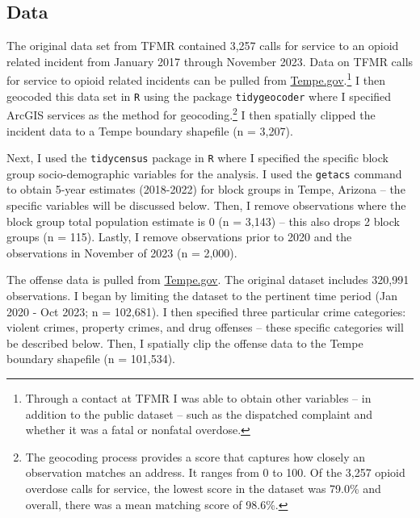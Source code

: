 \subsection{Data}
The original data set from TFMR contained 3,257 calls for service to an opioid related incident from January 2017 through November 2023. Data on TFMR calls for service to opioid related incidents can be pulled from \href{https://data.tempe.gov/datasets/2daeeafd2741494c8294ca415e5a793e_0/explore?location=33.398962%2C-111.931850%2C11.94}{Tempe.gov}.\footnote{Through a contact at TFMR I was able to obtain other variables -- in addition to the public dataset -- such as the dispatched complaint and whether it was a fatal or nonfatal overdose.} I then geocoded this data set in \texttt{R} using the package \texttt{tidygeocoder} where I specified ArcGIS services as the method for geocoding.\footnote{The geocoding process provides a score that captures how closely an observation matches an address. It ranges from 0 to 100. Of the 3,257 opioid overdose calls for service, the lowest score in the dataset was 79.0\% and overall, there was a mean matching score of 98.6\%.} I then spatially clipped the incident data to a Tempe boundary shapefile (n = 3,207). 

Next, I used the \texttt{tidycensus} package in \texttt{R} where I specified the specific block group socio-demographic variables for the analysis. I used the \texttt{getacs} command to obtain 5-year estimates (2018-2022) for block groups in Tempe, Arizona -- the specific variables will be discussed below. Then, I remove observations where the block group total population estimate is 0 (n = 3,143) -- this also drops 2 block groups (n = 115). Lastly, I remove observations prior to 2020 and the observations in November of 2023 (n = 2,000). 

The offense data is pulled from \href{https://data.tempe.gov/datasets/1563be5b343b4f78b1163e97a9a503ad_0/explore?location=32.279019%2C-112.767075%2C7.97}{Tempe.gov}. The original dataset includes 320,991 observations. I began by limiting the dataset to the pertinent time period (Jan 2020 - Oct 2023; n = 102,681). I then specified three particular crime categories: violent crimes, property crimes, and drug offenses -- these specific categories will be described below. Then, I spatially clip the offense data to the Tempe boundary shapefile (n = 101,534). 

